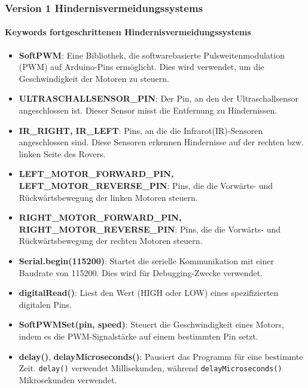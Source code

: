 \documentclass{vorlage-design-main}
\begin{document}
\hypertarget{version-1-hindernisvermeidungssystems}{%
\subsubsection{Version 1
Hindernisvermeidungssystems}\label{version-1-hindernisvermeidungssystems}}

\hypertarget{keywords-fortgeschrittenen-hindernisvermeidungssystems}{%
\paragraph{Keywords fortgeschrittenen
Hindernisvermeidungssystems}\label{keywords-fortgeschrittenen-hindernisvermeidungssystems}}

\begin{itemize}
\item
  \textbf{SoftPWM}: Eine Bibliothek, die softwarebasierte
  Pulsweitenmodulation (PWM) auf Arduino-Pins ermöglicht. Dies wird
  verwendet, um die Geschwindigkeit der Motoren zu steuern.
\item
  \textbf{ULTRASCHALLSENSOR\_PIN}: Der Pin, an den der Ultraschallsensor
  angeschlossen ist. Dieser Sensor misst die Entfernung zu Hindernissen.
\item
  \textbf{IR\_RIGHT, IR\_LEFT}: Pins, an die die Infrarot(IR)-Sensoren
  angeschlossen sind. Diese Sensoren erkennen Hindernisse auf der
  rechten bzw. linken Seite des Rovers.
\item
  \textbf{LEFT\_MOTOR\_FORWARD\_PIN, LEFT\_MOTOR\_REVERSE\_PIN}: Pins,
  die die Vorwärts- und Rückwärtsbewegung der linken Motoren steuern.
\item
  \textbf{RIGHT\_MOTOR\_FORWARD\_PIN, RIGHT\_MOTOR\_REVERSE\_PIN}: Pins,
  die die Vorwärts- und Rückwärtsbewegung der rechten Motoren steuern.
\item
  \textbf{Serial.begin(115200)}: Startet die serielle Kommunikation mit
  einer Baudrate von 115200. Dies wird für Debugging-Zwecke verwendet.
\item
  \textbf{digitalRead()}: Liest den Wert (HIGH oder LOW) eines
  spezifizierten digitalen Pins.
\item
  \textbf{SoftPWMSet(pin, speed)}: Steuert die Geschwindigkeit eines
  Motors, indem es die PWM-Signalstärke auf einem bestimmten Pin setzt.
\item
  \textbf{delay()}, \textbf{delayMicroseconds()}: Pausiert das Programm
  für eine bestimmte Zeit. \verb|delay()| verwendet
  Millisekunden, während \verb|delayMicroseconds()|
  Mikrosekunden verwendet.

\end{itemize}
\end{document}
